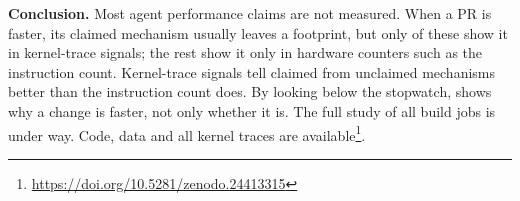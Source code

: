 \textbf{Conclusion.} Most agent performance claims are not measured. When
a PR is faster, its claimed mechanism usually leaves a footprint, but
only \nHeldFastKernel of these \nHeldFast show it in kernel-trace signals;
the rest show it only in hardware counters such as the instruction count.
Kernel-trace signals tell claimed
from unclaimed mechanisms better than the instruction count does. By looking below the stopwatch, \sys shows why a
change is faster, not only whether it is. The full study of all \nJobs build jobs is
under way. Code, data and all kernel traces are
available\footnote{\url{https://doi.org/10.5281/zenodo.24413315}}.
